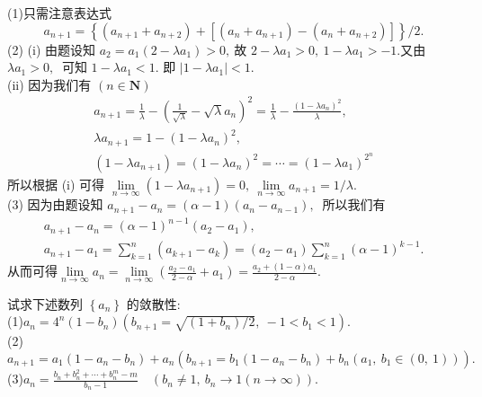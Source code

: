 	\begin{solution}
		(1)只需注意表达式
		$$a_{n+1}=\left\{\left(a_{n+1}+a_{n+2}\right)+\left[\left(a_{n}+a_{n+1}\right)-\left(a_{n}+a_{n+2}\right)\right]\right\} / 2.$$
		(2) (i) 由题设知 $ a_{2}=a_{1}\left(2-\lambda a_{1}\right)>0 ,\  $故  $2-\lambda a_{1}>0,\ 1-\lambda a_{1}>-1 . $又由  $\lambda a_{1}>  0 ,\ $ 可知  $1-\lambda a_{1}<1 .$ 即  $\left|1-\lambda a_{1}\right|<1 .$\\
		(ii) 因为我们有  $(n \in \mathbf{N})$
		$$\begin{array}{l}
			a_{n+1}=\frac{1}{\lambda}-\left(\frac{1}{\sqrt{\lambda}}-\sqrt{\lambda} a_{n}\right)^{2}=\frac{1}{\lambda}-\frac{\left(1-\lambda a_{n}\right)^{2}}{\lambda},\  \\
			\lambda a_{n+1}=1-\left(1-\lambda a_{n}\right)^{2},\  \\
			\left(1-\lambda a_{n+1}\right)=\left(1-\lambda a_{n}\right)^{2}=\cdots=\left(1-\lambda a_{1}\right)^{2^{n}}
		\end{array}$$
		所以根据 (i) 可得  $\lim\limits _{n \rightarrow \infty}\left(1-\lambda a_{n+1}\right)=0,\ \lim\limits _{n \rightarrow \infty} a_{n+1}=1 / \lambda .$\\
		(3) 因为由题设知  $a_{n+1}-a_{n}=(\alpha-1)\left(a_{n}-a_{n-1}\right) ,\ $ 所以我们有
		$$\begin{array}{l}
			a_{n+1}-a_{n}=(\alpha-1)^{n-1}\left(a_{2}-a_{1}\right),\  \\
			a_{n+1}-a_{1}=\sum\limits_{k=1}^{n}\left(a_{k+1}-a_{k}\right)=\left(a_{2}-a_{1}\right) \sum\limits_{k=1}^{n}(\alpha-1)^{k-1} .
		\end{array}$$
		从而可得$\lim\limits_{n\rightarrow\infty}a_n=\lim\limits_{n\rightarrow\infty}\left(\frac{a_2-a_1}{2-\alpha}+a_1\right)=\frac{a_2+(1-\alpha)a_1}{2-\alpha}.$
	\end{solution}
	\newpage
	\begin{problem}
		试求下述数列  $\left\{a_{n}\right\}$  的敛散性:\\
		(1)$a_{n}=4^{n}\left(1-b_{n}\right)\left(b_{n+1}=\sqrt{\left(1+b_{n}\right) / 2},\ -1<b_{1}<1\right) .$\\
		(2)$a_{n+1}=a_{1}\left(1-a_{n}-b_{n}\right)+a_{n}\left(b_{n+1}=b_{1}\left(1-a_{n}-b_{n}\right)+b_{n}\left(a_{1},\  b_{1} \in(0,\ 1)\right)\right) .$\\
		(3)$a_{n}=\frac{b_{n}+b_{n}^{2}+\cdots+b_{n}^{m}-m}{b_{n}-1} \quad\left(b_{n} \neq 1,\  b_{n} \rightarrow 1(n \rightarrow \infty)\right) .$
	\end{problem}
	
